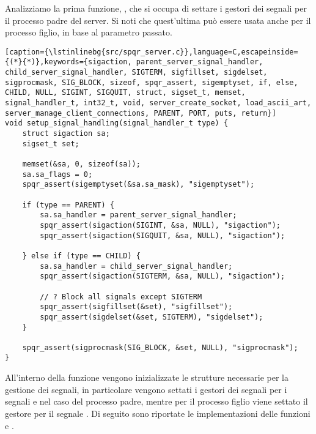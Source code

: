 Analizziamo la prima funzione, , che si occupa di settare i gestori dei segnali per il processo padre del server.
Si noti che quest'ultima può essere usata anche per il processo figlio, in base al parametro passato.

\begin{lstlisting}[caption={\lstinlinebg{src/spqr_server.c}},language=C,escapeinside={(*}{*)},keywords={sigaction, parent_server_signal_handler, child_server_signal_handler, SIGTERM, sigfillset, sigdelset, sigprocmask, SIG_BLOCK, sizeof, spqr_assert, sigemptyset, if, else, CHILD, NULL, SIGINT, SIGQUIT, struct, sigset_t, memset, signal_handler_t, int32_t, void, server_create_socket, load_ascii_art, server_manage_client_connections, PARENT, PORT, puts, return}]
void setup_signal_handling(signal_handler_t type) {
    struct sigaction sa;
    sigset_t set;

    memset(&sa, 0, sizeof(sa));
    sa.sa_flags = 0;
    spqr_assert(sigemptyset(&sa.sa_mask), "sigemptyset");

    if (type == PARENT) {
        sa.sa_handler = parent_server_signal_handler;
        spqr_assert(sigaction(SIGINT, &sa, NULL), "sigaction");
        spqr_assert(sigaction(SIGQUIT, &sa, NULL), "sigaction");

    } else if (type == CHILD) {
        sa.sa_handler = child_server_signal_handler;
        spqr_assert(sigaction(SIGTERM, &sa, NULL), "sigaction");

        // ? Block all signals except SIGTERM
        spqr_assert(sigfillset(&set), "sigfillset");
        spqr_assert(sigdelset(&set, SIGTERM), "sigdelset");
    }

    spqr_assert(sigprocmask(SIG_BLOCK, &set, NULL), "sigprocmask");
}
\end{lstlisting}

All'interno della funzione  vengono inizializzate le strutture necessarie per la gestione dei segnali, in particolare vengono settati i gestori dei segnali per i segnali  e  nel caso del processo padre, mentre per il processo figlio viene settato il gestore per il segnale .
Di seguito sono riportate le implementazioni delle funzioni  e .

